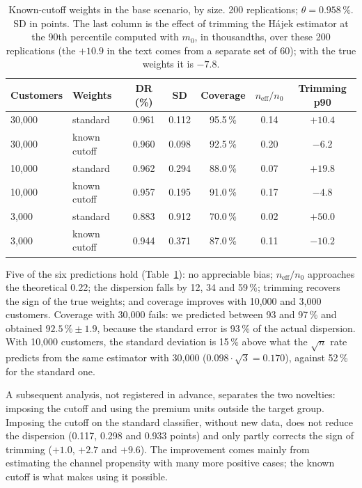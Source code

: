 \documentclass[11pt,a4paper]{article}
\newcommand{\neff}{n_{\mathrm{eff}}}
\theoremstyle{plain}
\theoremstyle{definition}
\begin{document}
\begin{table}[ht]
\centering\small
\caption{Known-cutoff weights in the base scenario, by size. 200 replications; $\theta=0.958\,\%$. SD in points. The last column is the effect of trimming the Hájek estimator at the 90th percentile computed with $m_0$, in thousandths, over these 200 replications (the $+10.9$ in the text comes from a separate set of 60); with the true weights it is $-7.8$.}\label{tab:cutoff}
\begin{tabular}{@{}llccccc@{}}
\toprule
Customers & Weights & DR (\%) & SD & Coverage & $\neff/n_0$ & Trimming p90 \\
\midrule
30{,}000 & standard & 0.961 & 0.112 & 95.5\,\% & 0.14 & $+10.4$ \\
30{,}000 & known cutoff & 0.960 & 0.098 & 92.5\,\% & 0.20 & $-6.2$ \\
10{,}000 & standard & 0.962 & 0.294 & 88.0\,\% & 0.07 & $+19.8$ \\
10{,}000 & known cutoff & 0.957 & 0.195 & 91.0\,\% & 0.17 & $-4.8$ \\
3{,}000 & standard & 0.883 & 0.912 & 70.0\,\% & 0.02 & $+50.0$ \\
3{,}000 & known cutoff & 0.944 & 0.371 & 87.0\,\% & 0.11 & $-10.2$ \\
\bottomrule
\end{tabular}
\end{table}

Five of the six predictions hold (Table~\ref{tab:cutoff}): no appreciable bias; $\neff/n_0$ approaches the theoretical 0.22; the dispersion falls by 12, 34 and 59\,\%; trimming recovers the sign of the true weights; and coverage improves with 10{,}000 and 3{,}000 customers. Coverage with 30{,}000 fails: we predicted between 93 and 97\,\% and obtained $92.5\,\%\pm1.9$, because the standard error is 93\,\% of the actual dispersion. With 10{,}000 customers, the standard deviation is 15\,\% above what the $\sqrt n$ rate predicts from the same estimator with 30{,}000 ($0.098\cdot\sqrt3=0.170$), against 52\,\% for the standard one.

A subsequent analysis, not registered in advance, separates the two novelties: imposing the cutoff and using the premium units outside the target group. Imposing the cutoff on the standard classifier, without new data, does not reduce the dispersion (0.117, 0.298 and 0.933 points) and only partly corrects the sign of trimming ($+1.0$, $+2.7$ and $+9.6$). The improvement comes mainly from estimating the channel propensity with many more positive cases; the known cutoff is what makes using it possible.
\end{document}
